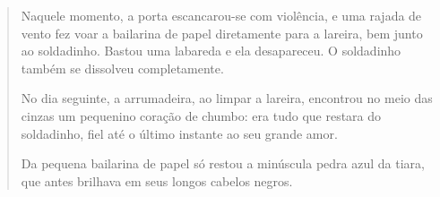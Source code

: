 \begin{quote}
Naquele momento, a porta escancarou-se com violência, e uma rajada de
vento fez voar a bailarina de papel diretamente para a lareira, bem
junto ao soldadinho. Bastou uma labareda e ela desapareceu. O soldadinho
também se dissolveu completamente.

No dia seguinte, a arrumadeira, ao limpar a lareira, encontrou no meio
das cinzas um pequenino coração de chumbo: era tudo que restara do
soldadinho, fiel até o último instante ao seu grande amor.

Da pequena bailarina de papel só restou a minúscula pedra azul da tiara,
que antes brilhava em seus longos cabelos negros.
\end{quote}



